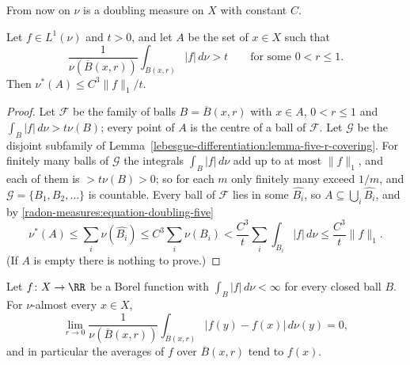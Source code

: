 From now on $\nu$ is a doubling measure on $X$ with constant $C$.

\begin{theorem}\label{radon-measures:theorem-doubling-maximal}
Let $f \in L^1(\nu)$ and $t > 0$, and let $A$ be the set of $x \in X$ such that
\[
\frac{1}{\nu(\overline{B}(x, r))}\int_{\overline{B}(x, r)}|f|\,d\nu > t \qquad \text{for some } 0 < r \leq 1 .
\]
Then $\nu^*(A) \leq C^3\|f\|_1/t$.
\end{theorem}

\begin{proof}
Let $\mathcal{F}$ be the family of balls $B = \overline{B}(x, r)$ with $x \in A$, $0 < r \leq 1$ and $\int_B|f|\,d\nu > t\nu(B)$; every point of $A$ is the centre of a ball of $\mathcal{F}$. Let
$\mathcal{G}$ be the disjoint subfamily of Lemma~\ref{lebesgue-differentiation:lemma-five-r-covering}. For finitely many balls of $\mathcal{G}$ the integrals $\int_B|f|\,d\nu$ add up to at most $\|f\|_1$, and each of them is
$> t\nu(B) > 0$; so for each $m$ only finitely many exceed $1/m$, and $\mathcal{G} = \{B_1, B_2, \ldots\}$ is countable. Every ball of $\mathcal{F}$ lies in some $\widehat{B_i}$, so
$A \subseteq \bigcup_i\widehat{B_i}$, and by \eqref{radon-measures:equation-doubling-five}
\[
\nu^*(A) \leq \sum_i\nu(\widehat{B_i}) \leq C^3\sum_i\nu(B_i) < \frac{C^3}{t}\sum_i\int_{B_i}|f|\,d\nu \leq \frac{C^3}{t}\|f\|_1 .
\]
(If $A$ is empty there is nothing to prove.)
\end{proof}

\begin{theorem}\label{radon-measures:theorem-doubling-lebesgue}
Let $f \colon X \to \RR$ be a Borel function with $\int_B|f|\,d\nu < \infty$ for every closed ball $B$. For $\nu$-almost every $x \in X$,
\[
\lim_{r \to 0}\frac{1}{\nu(\overline{B}(x, r))}\int_{\overline{B}(x, r)}|f(y) - f(x)|\,d\nu(y) = 0,
\]
and in particular the averages of $f$ over $\overline{B}(x, r)$ tend to $f(x)$.
\end{theorem}

